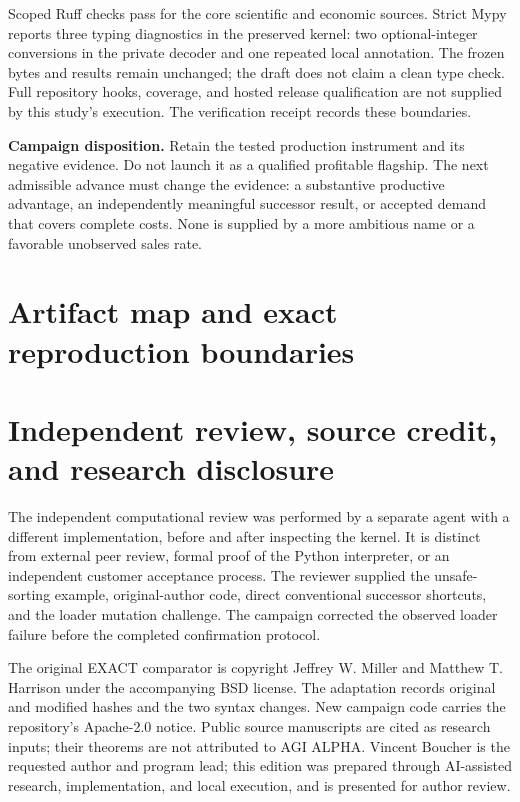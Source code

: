 \documentclass[11pt,letterpaper]{article}
\begin{document}
Scoped Ruff checks pass for the core scientific and economic sources. Strict Mypy
reports three typing diagnostics in the preserved kernel: two optional-integer
conversions in the private decoder and one repeated local annotation. The frozen
bytes and results remain unchanged; the draft does not claim a clean type check.
Full repository hooks, coverage, and hosted release qualification are not supplied
by this study's execution. The verification receipt records these boundaries.

\begin{evidencebox}
\textbf{Campaign disposition.} Retain the tested production instrument and its
negative evidence. Do not launch it as a qualified profitable flagship. The next
admissible advance must change the evidence: a substantive productive advantage,
an independently meaningful successor result, or accepted demand that covers complete
costs. None is supplied by a more ambitious name or a favorable unobserved sales rate.
\end{evidencebox}

\appendix
\section{Artifact map and exact reproduction boundaries}


\section{Independent review, source credit, and research disclosure}

The independent computational review was performed by a separate agent with a
different implementation, before and after inspecting the kernel. It is distinct
from external peer review, formal proof of the Python interpreter, or an independent
customer acceptance process. The reviewer supplied the unsafe-sorting example,
original-author code, direct conventional successor shortcuts, and the loader mutation
challenge. The campaign corrected the observed loader failure before the completed
confirmation protocol.

The original EXACT comparator is copyright Jeffrey W. Miller and Matthew T. Harrison
under the accompanying BSD license. The adaptation records original and modified
hashes and the two syntax changes. New campaign code carries the repository's
Apache-2.0 notice. Public source manuscripts are cited as research inputs; their
theorems are not attributed to AGI ALPHA. Vincent Boucher is the requested author
and program lead; this edition was prepared through AI-assisted research, implementation,
and local execution, and is presented for author review.
\end{document}
